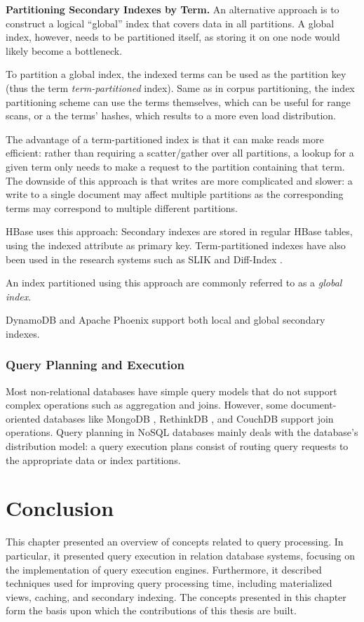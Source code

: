 \bigskip
\noindent
\textbf{Partitioning Secondary Indexes by Term.}
An alternative approach is to construct a logical ``global'' index that covers data in all partitions.
A global index, however, needs to be partitioned itself, as storing it on one node would likely become a bottleneck.

To partition a global index, the indexed terms can be used as the partition key (thus the term \textit{term-partitioned}
index).
Same as in corpus partitioning, the index partitioning scheme can use the terms themselves, which can be useful for
range scans, or a the terms' hashes, which results to a more even load distribution.

The advantage of a term-partitioned index is that it can make reads more efficient:
rather than requiring a scatter/gather over all partitions, a lookup for a given term only needs to make a request to the
partition containing that term.
The downside of this approach is that writes are more complicated and slower:
a write to a single document may affect multiple partitions as the corresponding terms may correspond to multiple
different partitions.

HBase \cite{hbase:secondaryindexes} uses this approach:
Secondary indexes are stored in regular HBase tables, using the indexed attribute as primary key.
Term-partitioned indexes have also been used in the research systems such as SLIK \cite{kejriwal:slik}
and Diff-Index \cite{tan:diffindex}.

An index partitioned using this approach are commonly referred to as a \textit{global index}.

\medskip
\noindent
DynamoDB \cite{dynamodb:secondaryindexes} and Apache Phoenix \cite{phoenix:secondaryidnexing} support both local and global secondary indexes.

\subsubsection{Query Planning and Execution}

Most non-relational databases have simple query models that do not support complex operations such as aggregation and
joins.
However, some document-oriented databases like MongoDB \cite{mongodb:joins}, RethinkDB \cite{rethinkdb:joins},
and CouchDB \cite{couchdb:joins} support join operations.
Query planning in NoSQL databases mainly deals with the database's distribution model:
a query execution plans consist of routing query requests to the appropriate data or index partitions.


\section{Conclusion}
This chapter presented an overview of concepts related to query processing.
In particular, it presented query execution in relation database systems,
focusing on the implementation of query execution engines.
Furthermore, it described techniques used for improving query processing time,
including materialized views, caching, and secondary indexing.
The concepts presented in this chapter form the basis upon which the contributions of this thesis are built.